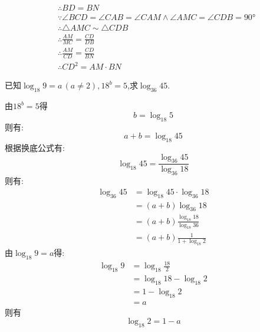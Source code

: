 \begin{questions}
\begin{proofsolution}
\begin{penum}
\begin{align*}
				       & \therefore BD = BN                                                                          \\
				       & \because \angle{BCD} = \angle{CAB} = \angle{CAM} \land \angle{AMC} = \angle{CDB} = \ang{90} \\
				       & \therefore \triangle{AMC} \sim \triangle{CDB}                                               \\
				       & \therefore \frac{AM}{MC} = \frac{CD}{DB}                                                    \\
				       & \therefore \frac{AM}{CD} = \frac{CD}{BN}                                                    \\
				       & \therefore CD^2 = AM\cdot BN
			      \end{align*}
		\end{penum}
	\end{proofsolution}

	\question[12] 已知$\log_{18}9=a\,(a\neq2), 18^b=5$,求$\log_{36}45$.

	\begin{solution}
		由$18^b=5$得
		\begin{equation*}
			b = \log_{18}5
		\end{equation*}
		则有:
		\begin{equation*}
			a + b = \log_{18}{45}
		\end{equation*}
		根据换底公式有:
		\begin{equation*}
			\log_{18}{45} = \frac{\log_{36}{45}}{\log_{36}{18}}
		\end{equation*}
		则有:
		\begin{align*}
			\log_{36}{45} & = \log_{18}{45}\cdot \log_{36}{18}         \\
			              & = (a+b)\log_{36}{18}                       \\
			              & = (a+b)\frac{\log_{18}{18}}{\log_{18}{36}} \\
			              & = (a+b)\frac1{1+\log_{18}2}
		\end{align*}
		由$\log_{18}{9} = a$得:
		\begin{align*}
			\log_{18}9 & = \log_{18}\frac{18}{2}    \\
			           & = \log_{18}18 - \log_{18}2 \\
			           & = 1 - \log_{18}{2}         \\
			           & = a
		\end{align*}
		则有
		\begin{equation*}
			\log_{18}2 = 1 - a
		\end{equation*}


\end{solution}
\end{questions}
